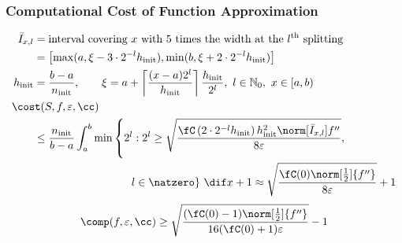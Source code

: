 \documentclass[12pt,compress,xcolor={usenames,dvipsnames}]{beamer} %
\DeclareMathOperator{\init}{init}
\newcommand{\abstol}{\varepsilon}
\begin{document}
\begin{frame}
	\frametitle{Computational Cost of Function Approximation}
	\vspace{-7ex}
	\begin{align*}
	 \bar{I}_{x,l}& =\text{interval covering $x$ with $5$ times the width at the $l^{\text{th}}$ splitting} \\
	 	&= \left[\max(a,\xi -3\cdot 2^{-l} h_{\init}),  \min(b, \xi +2 \cdot 2^{-l} h_{\init})\right] \\
h_{\init}  &= \frac{b-a}{n_{\init}}, \qquad	\xi= a + \left\lceil\frac{(x-a)2^l}{h_{\init}}\right\rceil \frac{h_{\init}}{2^l}, \ l \in \mathbb{N}_0, \ x \in [a,b) \\
	\MoveEqLeft{\cost(S,f,\varepsilon,\cc)} \\
	&\le \frac{n_{\init}}{b-a}\int_a^b \min\left\{2^l:  2^l \ge \sqrt{\frac{\fC\left(2\cdot 2^{-l} h_{\init}\right) h_{\init}^2 \norm[\bar{I}_{x,l}]{f''} }{8 \abstol}}, \right .\\
	&\hspace{20ex}\left .  l \in  \natzero\right\} \, \dif x + 1 \approx \sqrt{\frac{\fC(0) \norm[\frac 12]{f''}}{8\abstol}} +1 
	\end{align*}
	\begin{equation*}
	\comp(f,\varepsilon,\cc) \ge \sqrt{\frac{(\fC(0)-1)  \norm[\frac12]{f''} }{16(\fC(0)+1)\varepsilon}} -1
	\end{equation*}
\end{frame}
\end{document}
